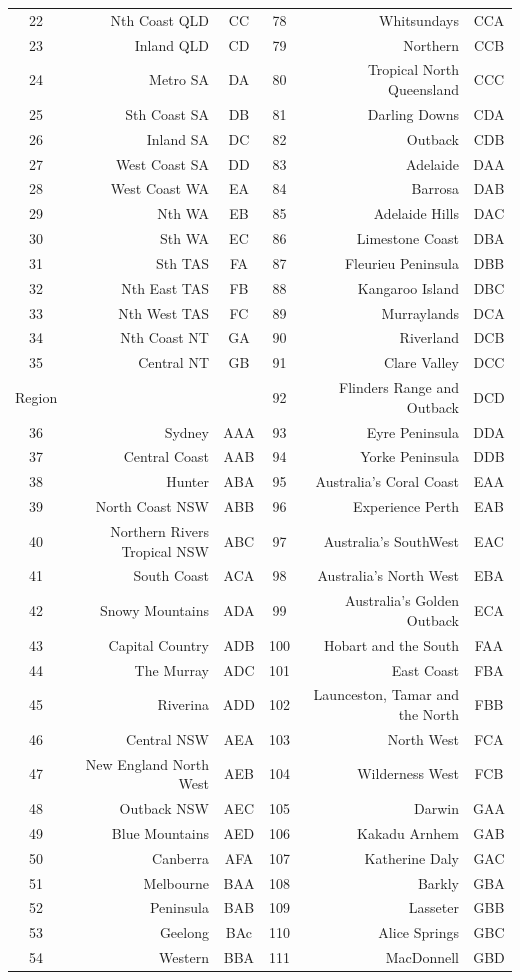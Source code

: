 \documentclass[11pt,a4paper,]{article}
\begin{document}
\begin{table}[t]
\begin{tabular}{crccrc}
22 & Nth Coast QLD & CC & 78 & Whitsundays & CCA\\
23 & Inland QLD & CD & 79 & Northern & CCB\\
24 & Metro SA & DA & 80 & Tropical North Queensland & CCC\\
25 & Sth Coast SA & DB & 81 & Darling Downs & CDA\\
26 & Inland SA & DC & 82 & Outback & CDB\\
27 & West Coast SA & DD & 83 & Adelaide & DAA\\
28 & West Coast WA & EA & 84 & Barrosa & DAB\\
29 & Nth WA & EB & 85 & Adelaide Hills & DAC\\
30 & Sth WA & EC & 86 & Limestone Coast & DBA\\
31 & Sth TAS & FA & 87 & Fleurieu Peninsula & DBB\\
32 & Nth East TAS & FB & 88 & Kangaroo Island & DBC\\
33 & Nth West TAS & FC & 89 & Murraylands & DCA\\
34 & Nth Coast NT & GA & 90 & Riverland & DCB\\
35 & Central NT & GB & 91 & Clare Valley & DCC\\
Region &  &  & 92 & Flinders Range and Outback & DCD\\
36 & Sydney & AAA & 93 & Eyre Peninsula & DDA\\
37 & Central Coast & AAB & 94 & Yorke Peninsula & DDB\\
38 & Hunter & ABA & 95 & Australia's Coral Coast & EAA\\
39 & North Coast NSW & ABB & 96 & Experience Perth & EAB\\
40 & Northern Rivers Tropical NSW & ABC & 97 & Australia's SouthWest & EAC\\
41 & South Coast & ACA & 98 & Australia's North West & EBA\\
42 & Snowy Mountains & ADA & 99 & Australia's Golden Outback & ECA\\
43 & Capital Country & ADB & 100 & Hobart and the South & FAA\\
44 & The Murray & ADC & 101 & East Coast & FBA\\
45 & Riverina & ADD & 102 & Launceston, Tamar and the North & FBB\\
46 & Central NSW & AEA & 103 & North West & FCA\\
47 & New England North West & AEB & 104 & Wilderness West & FCB\\
48 & Outback NSW & AEC & 105 & Darwin & GAA\\
49 & Blue Mountains & AED & 106 & Kakadu Arnhem & GAB\\
50 & Canberra & AFA & 107 & Katherine Daly & GAC\\
51 & Melbourne & BAA & 108 & Barkly & GBA\\
52 & Peninsula & BAB & 109 & Lasseter & GBB\\
53 & Geelong & BAc & 110 & Alice Springs & GBC\\
54 & Western & BBA & 111 & MacDonnell & GBD\\
\bottomrule
\end{tabular}
\end{table}
\end{document}
